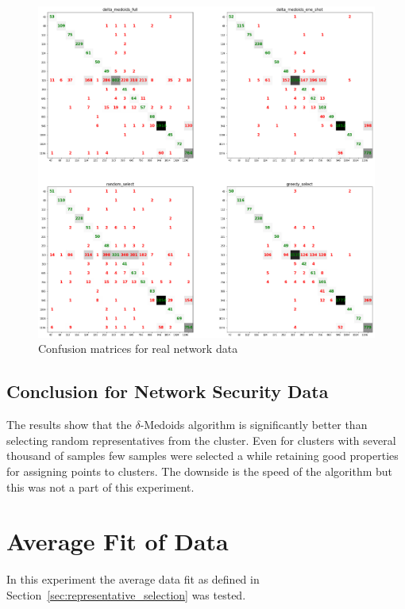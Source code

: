 \documentclass[thesis=B,english]{FITthesis}[2012/10/20]
\begin{document}
\begin{figure}[H]
   \includegraphics[width=\linewidth]{img/exp4.png}
  \caption{Confusion matrices for real network data}
  \label{img:exp4}
\end{figure}


\subsection{Conclusion for Network Security Data}
The results show that the $\delta$-Medoids algorithm is significantly better than selecting random representatives from the cluster.
Even for clusters with several thousand of samples few samples were selected a while retaining good properties for assigning points to clusters.
The downside is the speed of the algorithm but this was not a part of this experiment.


\section{Average Fit of Data}\label{sec:exp5}

In this experiment the average data fit as defined in Section~\ref{sec:representative_selection} was tested.
\end{document}
